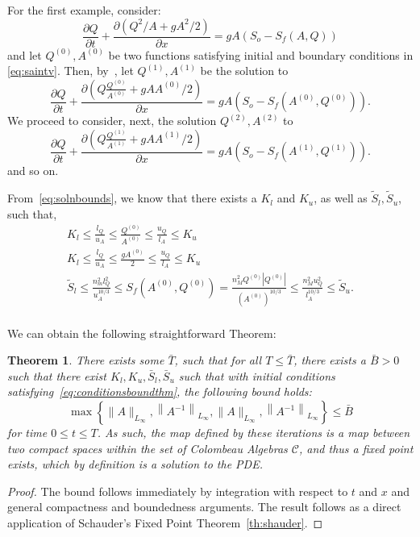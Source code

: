 \documentclass{article}
\newcommand{\1}{\mathds{1}}          %
\newtheorem{theorem}{Theorem}[section]
\theoremstyle{definition}
\begin{document}
\begin{sloppypar}
For the first example, consider:
\[
\frac{\partial Q}{\partial t} +\frac{\partial(Q^2/A+g A^2/2)}{\partial x}=gA(S_o-S_f(A,Q))
\]
and let $Q^{(0)},A^{(0)}$ be two functions satisfying initial and boundary conditions in \eqref{eq:saintv}. Then, by~\cite{Oberguggenberger1987}, let $Q^{(1)},A^{(1)}$ be the solution to
\[
\frac{\partial Q}{\partial t} +\frac{\partial(Q\frac{Q^{(0)}}{A^{(0)}}+g AA^{(0)}/2)}{\partial x}=gA(S_o-S_f(A^{(0)},Q^{(0)})).
\]
We proceed to consider, next, the solution $Q^{(2)},A^{(2)}$ to
\[
\frac{\partial Q}{\partial t} +\frac{\partial(Q\frac{Q^{(1)}}{A^{(1)}}+g AA^{(1)}/2)}{\partial x}=gA(S_o-S_f(A^{(1)},Q^{(1)})).
\]
and so on. 

From~\eqref{eq:solnbounds}, we know that there exists a $K_l$ and $K_u$, as well as $\tilde{S}_l,\tilde{S}_u$, such that,
\begin{equation}\label{eq:conditionsboundthm}
\begin{array}{l}
K_l\le \frac{l_Q}{u_A}\le \frac{Q^{(0)}}{A^{(0)}} \le \frac{u_Q}{l_A}\le K_u \\
K_l\le \frac{l_Q}{u_A}\le \frac{gA^{(0)}}{2} \le \frac{u_Q}{l_A}\le K_u \\
\tilde{S}_l\le \frac{n_m^2 l^2_Q}{u^{10/3}_A}\le S_f(A^{(0)},Q^{(0)}) = \frac{n_M^2 Q^{(0)}\left\vert Q^{(0)}\right\vert}{(A^{(0)})^{10/3}} \le \frac{n_M^2 u^2_Q}{l^{10/3}_A}\le \tilde{S}_u. \\
\end{array}
\end{equation}

We can obtain the following straightforward Theorem:
\begin{theorem}
    There exists some $\bar{T}$, such that for all $T\le \bar{T}$, there exists a $\bar{B}>0$ such that there exist $K_l,K_u,\bar{S}_l,\bar{S}_u$ such that with initial conditions satisfying~\eqref{eq:conditionsboundthm}, the following bound holds:
    \begin{equation}
    \max\left\{\|A\|_{L_{\infty}},\left\|A^{-1}\right\|_{L_{\infty}},\|A\|_{L_{\infty}},\left\|A^{-1}\right\|_{L_{\infty}}\right\} \le \bar{B}
    \end{equation}
    for time $0\le t\le T$. As such, the map defined by these iterations is a map between two compact spaces within the set of Colombeau Algebras $\mathcal{C}$, and thus a fixed point exists, which by definition is a solution to the PDE. 
\end{theorem}
\begin{proof}
    The bound follows immediately by integration with respect to $t$ and $x$ and general compactness and boundedness arguments. The result follows as a direct application of Schauder's Fixed Point Theorem~\ref{th:shauder}.
\end{proof}

\end{sloppypar}
\end{document}
